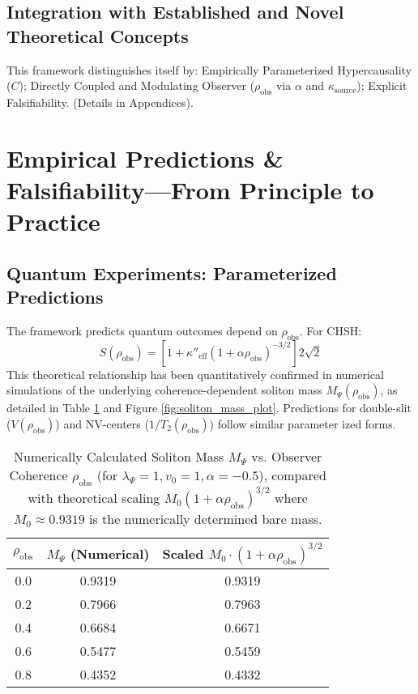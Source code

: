 \documentclass{report}
\begin{document}
    \subsection{Integration with Established and Novel Theoretical Concepts}
    \label{subsec:integration_established_novel_concepts}
    This framework distinguishes itself by: Empirically Parameterized Hypercausality ($C$); Directly
    Coupled and Modulating Observer ($\rho_{\text{obs}}$ via $\alpha$ and $\kappa_{\text{source}}$); Explicit Falsifiability. (Details in
    Appendices).

\section{Empirical Predictions \& Falsifiability—From Principle to Practice}
\label{sec:empirical_falsifiability}
    \subsection{Quantum Experiments: Parameterized Predictions}
    \label{subsec:quantum_experiments_parameterized}
    The framework predicts quantum outcomes depend on $\rho_{\text{obs}}$. For CHSH:
    \begin{equation}
        S(\rho_{\text{obs}}) = \left[1 + \kappa''_{\text{eff}}(1 + \alpha\rho_{\text{obs}})^{-3/2}\right] 2\sqrt{2}
    \end{equation}
    This theoretical relationship has been quantitatively confirmed in numerical simulations of the
    underlying coherence-dependent soliton mass $M_{\Psi}(\rho_{\text{obs}})$, as detailed in Table \ref{tab:soliton_mass_vs_coherence} and Figure \ref{fig:soliton_mass_plot}.
    Predictions for double-slit ($V(\rho_{\text{obs}})$) and NV-centers ($1/T_2(\rho_{\text{obs}})$) follow similar parameter ized forms.

    \begin{table}[h!]
    \centering
    \caption{Numerically Calculated Soliton Mass $M_{\Psi}$ vs. Observer Coherence $\rho_{\text{obs}}$ (for $\lambda_{\Psi} = 1, v_0 = 1, \alpha = -0.5$), compared with theoretical scaling $M_0(1 + \alpha\rho_{\text{obs}})^{3/2}$ where $M_0 \approx 0.9319$ is the numerically determined bare mass.}
    \label{tab:soliton_mass_vs_coherence}
    \begin{tabular}{|c|c|c|}
    \hline
    $\rho_{\text{obs}}$ & $M_{\Psi}$ (Numerical) & Scaled $M_0 \cdot (1 + \alpha\rho_{\text{obs}})^{3/2}$ \\
    \hline
    0.0 & 0.9319 & 0.9319 \\
    0.2 & 0.7966 & 0.7963 \\
    0.4 & 0.6684 & 0.6671 \\
    0.6 & 0.5477 & 0.5459 \\
    0.8 & 0.4352 & 0.4332 \\
    \hline
    \end{tabular}
    \end{table}
\end{document}
